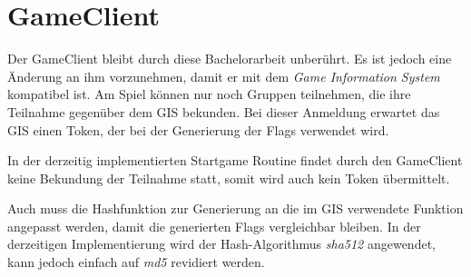 \section{GameClient} \label{sec:GameClient}
Der GameClient bleibt durch diese Bachelorarbeit unberührt. Es ist jedoch eine Änderung an ihm vorzunehmen, damit er mit dem \textit{Game Information System} kompatibel ist.
Am Spiel können nur noch Gruppen teilnehmen, die ihre Teilnahme gegenüber dem GIS bekunden. Bei dieser Anmeldung erwartet das GIS einen Token, der bei der Generierung der Flags verwendet wird. 

In der derzeitig implementierten Startgame Routine findet durch den GameClient keine Bekundung der Teilnahme statt, somit wird auch kein Token übermittelt.

Auch muss die Hashfunktion zur Generierung an die im GIS verwendete Funktion angepasst werden, damit die generierten Flags vergleichbar bleiben. In der derzeitigen Implementierung wird der Hash-Algorithmus \textit{sha512} angewendet, kann jedoch einfach auf \textit{md5} revidiert werden.